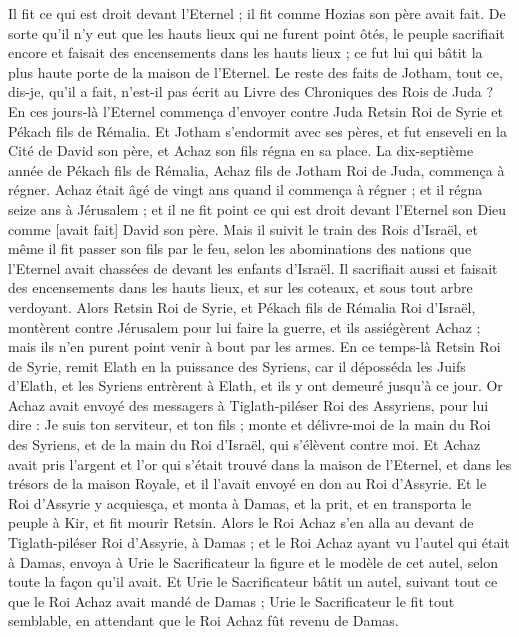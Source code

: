 \begin{multicols}{2}
Il fit ce qui est droit devant l'Eternel ; il fit comme Hozias son père avait fait.
De sorte qu'il n'y eut que les hauts lieux qui ne furent point ôtés, le peuple sacrifiait encore et faisait des encensements dans les hauts lieux ; ce fut lui qui bâtit la plus haute porte de la maison de l'Eternel.
Le reste des faits de Jotham, tout ce, dis-je, qu'il a fait, n'est-il pas écrit au Livre des Chroniques des Rois de Juda ?
En ces jours-là l'Eternel commença d'envoyer contre Juda Retsin Roi de Syrie et Pékach fils de Rémalia.
Et Jotham s'endormit avec ses pères, et fut enseveli en la Cité de David son père, et Achaz son fils régna en sa place.
\VerseOne{}La dix-septième année de Pékach fils de Rémalia, Achaz fils de Jotham Roi de Juda, commença à régner.
Achaz était âgé de vingt ans quand il commença à régner ; et il régna seize ans à Jérusalem ; et il ne fit point ce qui est droit devant l'Eternel son Dieu comme [avait fait] David son père.
Mais il suivit le train des Rois d'Israël, et même il fit passer son fils par le feu, selon les abominations des nations que l'Eternel avait chassées de devant les enfants d'Israël.
Il sacrifiait aussi et faisait des encensements dans les hauts lieux, et sur les coteaux, et sous tout arbre verdoyant.
Alors Retsin Roi de Syrie, et Pékach fils de Rémalia Roi d'Israël, montèrent contre Jérusalem pour lui faire la guerre, et ils assiégèrent Achaz ; mais ils n'en purent point venir à bout par les armes.
En ce temps-là Retsin Roi de Syrie, remit Elath en la puissance des Syriens, car il déposséda les Juifs d'Elath, et les Syriens entrèrent à Elath, et ils y ont demeuré jusqu'à ce jour.
Or Achaz avait envoyé des messagers à Tiglath-piléser Roi des Assyriens, pour lui dire : Je suis ton serviteur, et ton fils ; monte et délivre-moi de la main du Roi des Syriens, et de la main du Roi d'Israël, qui s'élèvent contre moi.
Et Achaz avait pris l'argent et l'or qui s'était trouvé dans la maison de l'Eternel, et dans les trésors de la maison Royale, et il l'avait envoyé en don au Roi d'Assyrie.
Et le Roi d'Assyrie y acquiesça, et monta à Damas, et la prit, et en transporta le peuple à Kir, et fit mourir Retsin.
Alors le Roi Achaz s'en alla au devant de Tiglath-piléser Roi d'Assyrie, à Damas ; et le Roi Achaz ayant vu l'autel qui était à Damas, envoya à Urie le Sacrificateur la figure et le modèle de cet autel, selon toute la façon qu'il avait.
Et Urie le Sacrificateur bâtit un autel, suivant tout ce que le Roi Achaz avait mandé de Damas ; Urie le Sacrificateur le fit tout semblable, en attendant que le Roi Achaz fût revenu de Damas.

\end{multicols}
